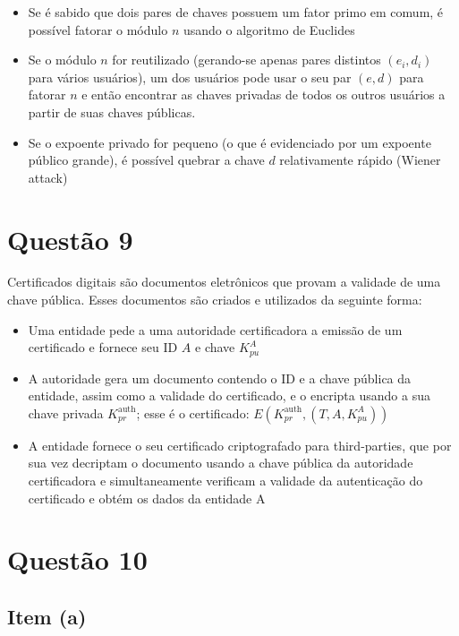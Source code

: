 \documentclass{article}
\begin{document}
\begin{itemize}
    \item Se é sabido que dois pares de chaves possuem um fator primo em comum, é possível fatorar o módulo $n$ usando o algoritmo de Euclides
    \item Se o módulo $n$ for reutilizado (gerando-se apenas pares distintos $(e_i,d_i)$ para vários usuários), um dos usuários pode usar o seu par $(e,d)$ para fatorar $n$ e então encontrar as chaves privadas de todos os outros usuários a partir de suas chaves públicas.
    \item Se o expoente privado for pequeno (o que é evidenciado por um expoente público grande), é possível quebrar a chave $d$ relativamente rápido (Wiener attack)
\end{itemize}

\section*{Questão 9}

Certificados digitais são documentos eletrônicos que provam a validade de uma chave pública. Esses documentos são criados e utilizados da seguinte forma:

\begin{itemize}
    \item Uma entidade pede a uma autoridade certificadora a emissão de um certificado e fornece seu ID $A$ e chave $K_{pu}^{A}$
    \item A autoridade gera um documento contendo o ID e a chave pública da entidade, assim como a validade do certificado, e o encripta usando a sua chave privada $K_{pr}^{\text{auth}}$; esse é o certificado: $E(K_{pr}^{\text{auth}}, (T, A, K_{pu}^A))$
    \item A entidade fornece o seu certificado criptografado para third-parties, que por sua vez decriptam o documento usando a chave pública da autoridade certificadora e simultaneamente verificam a validade da autenticação do certificado e obtém os dados da entidade A
\end{itemize}

\section*{Questão 10}

\subsection*{Item (a)}
\end{document}
